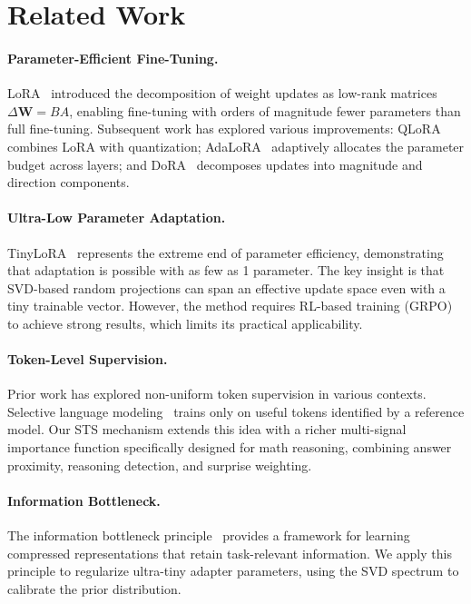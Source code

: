 \documentclass{article}
\newcommand{\bW}{\mathbf{W}}
\begin{document}
\section{Related Work}

\paragraph{Parameter-Efficient Fine-Tuning.}
LoRA~\citep{hu2022lora} introduced the decomposition of weight updates as low-rank matrices $\Delta\bW = BA$, enabling fine-tuning with orders of magnitude fewer parameters than full fine-tuning. Subsequent work has explored various improvements: QLoRA~\citep{dettmers2024qlora} combines LoRA with quantization; AdaLoRA~\citep{zhang2023adalora} adaptively allocates the parameter budget across layers; and DoRA~\citep{liu2024dora} decomposes updates into magnitude and direction components.

\paragraph{Ultra-Low Parameter Adaptation.}
TinyLoRA~\citep{morris2026tinylora} represents the extreme end of parameter efficiency, demonstrating that adaptation is possible with as few as 1 parameter. The key insight is that SVD-based random projections can span an effective update space even with a tiny trainable vector. However, the method requires RL-based training (GRPO) to achieve strong results, which limits its practical applicability.

\paragraph{Token-Level Supervision.}
Prior work has explored non-uniform token supervision in various contexts. Selective language modeling~\citep{lin2024rho1} trains only on useful tokens identified by a reference model. Our STS mechanism extends this idea with a richer multi-signal importance function specifically designed for math reasoning, combining answer proximity, reasoning detection, and surprise weighting.

\paragraph{Information Bottleneck.}
The information bottleneck principle~\citep{tishby2000information} provides a framework for learning compressed representations that retain task-relevant information. We apply this principle to regularize ultra-tiny adapter parameters, using the SVD spectrum to calibrate the prior distribution.
\end{document}

